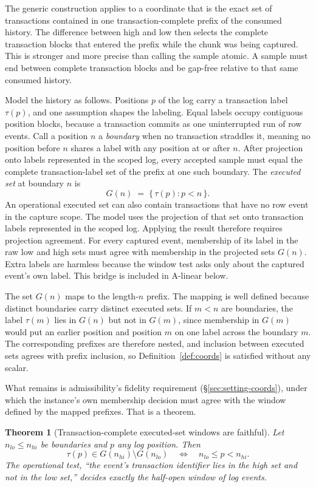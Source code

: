 \documentclass[sigconf,nonacm,10pt]{acmart}
\theoremstyle{plain}
\newtheorem{theorem}{Theorem}
\theoremstyle{definition}
\begin{document}
The generic construction applies to a coordinate that is the exact
set of transactions contained in one transaction-complete prefix of
the consumed history. The difference between high and low then selects
the complete transaction blocks that entered the prefix while the
chunk was being captured. This is stronger and more precise than
calling the sample atomic. A sample must end between complete
transaction blocks and be gap-free relative to that same consumed
history.

Model the history as follows. Positions $p$ of the log carry a
transaction label $\tau(p)$, and one assumption shapes the
labeling. Equal labels occupy contiguous position blocks, because
a transaction commits as one uninterrupted run of row events. Call
a position $n$ a \emph{boundary} when no transaction straddles it, meaning
no position before $n$ shares a label with any position at or
after $n$. After projection onto labels represented in the scoped log,
every accepted sample must equal the complete transaction-label set of
the prefix at one such boundary. The \emph{executed set} at boundary
$n$ is
\[
G(n) \;=\; \{\, \tau(p) : p < n \,\}.
\]
An operational executed set can also contain transactions that
have no row event in the capture scope. The model uses the
projection of that set onto transaction labels represented in the
scoped log. Applying the result therefore requires projection
agreement. For every captured event, membership of its label in
the raw low and high sets must agree with membership in the
projected sets $G(n)$. Extra labels are harmless because the
window test asks only about the captured event's own label. This
bridge is included in A-linear below.

The set $G(n)$ maps to the length-$n$ prefix. The mapping is
well defined because distinct boundaries carry distinct executed
sets. If $m < n$ are boundaries, the label $\tau(m)$ lies in
$G(n)$ but not in $G(m)$, since membership in $G(m)$ would put an
earlier position and position $m$ on one label across the boundary
$m$. The corresponding prefixes are therefore nested, and inclusion
between executed sets agrees with prefix inclusion, so
Definition~\ref{def:coords} is satisfied without any scalar.

What remains is admissibility's fidelity requirement 
(\S\ref{sec:setting-coords}), under which the instance's own membership
decision must agree with the window defined by the mapped prefixes. That is a
theorem.

\begin{theorem}[Transaction-complete executed-set windows are faithful]
\label{thm:oracle}
Let $n_{lo} \le n_{hi}$ be boundaries and $p$ any log position.
Then
\[
\tau(p) \in G(n_{hi}) \setminus G(n_{lo})
\quad\Longleftrightarrow\quad
n_{lo} \le p < n_{hi}.
\]
The operational test, ``the event's transaction identifier lies in
the high set and not in the low set,'' decides exactly the
half-open window of log events.
\end{theorem}
\end{document}
